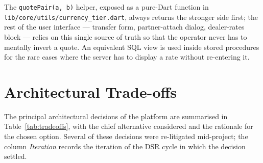 The \texttt{quotePair(a, b)} helper, exposed as a pure-Dart function in \texttt{lib/core/utils/currency\_tier.dart}, always returns the stronger side first; the rest of the user interface --- transfer form, partner-attach dialog, dealer-rates block --- relies on this single source of truth so that the operator never has to mentally invert a quote. An equivalent SQL view is used inside stored procedures for the rare cases where the server has to display a rate without re-entering it.

\section{Architectural Trade-offs}
\label{sec:tradeoffs}

The principal architectural decisions of the platform are summarised in Table~\ref{tab:tradeoffs}, with the chief alternative considered and the rationale for the chosen option. Several of these decisions were re-litigated mid-project; the column \emph{Iteration} records the iteration of the DSR cycle in which the decision settled.

